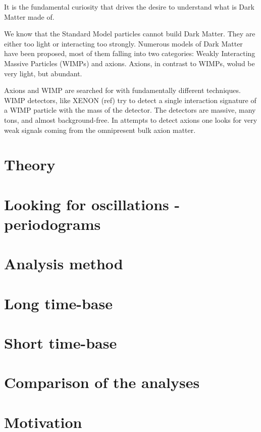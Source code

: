 It is the fundamental curiosity that drives the desire to understand what is Dark Matter made of.

We know that the Standard Model particles cannot build Dark Matter. They are either too light or interacting too strongly. Numerous models of Dark Matter have been proposed, most of them falling into two categories: Weakly Interacting Massive Particles (WIMPs) and axions. Axions, in contrast to WIMPs, wolud be very light, but abundant.

Axions and WIMP are searched for with fundamentally different techniques. WIMP detectors, like XENON (ref) try to detect a single interaction signature of a WIMP particle with the mass of the detector. The detectors are massive, many tons, and almost background-free. In attempts to detect axions one looks for very weak signals coming from the omnipresent bulk axion matter.

\section{Theory}

\section{Looking for oscillations - periodograms}

\section{Analysis method}

\section{Long time-base}

\section{Short time-base}

\section{Comparison of the analyses}










\section{Motivation}


